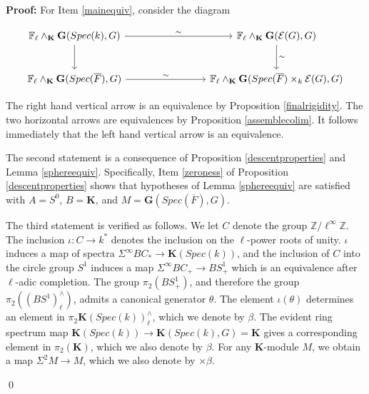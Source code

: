 \documentclass[11pt]{article}
\newcommand\mb{\mathbb}
\newcommand\mc{\mathcal}
\def \bK{\mathbf K}
\newcommand\mfk{\mathbf G}
\newenvironment{Proof}{\par\noindent\textbf{Proof:}}
{\qed}
\begin{document}
\begin{Proof}
   For Item \ref{mainequiv}, consider the diagram
\begin{center} \vspace{-1cm}
\begin{equation} 
\begin{tikzcd}[row sep=2.5em, column sep=8em]
\mb{F}_{\ell} \wedge  _{\bK} \mfk(Spec(k), G) 
\arrow[r, "\sim"] \arrow[d]
& \mb{F}_{\ell} \wedge  _{\bK} \mfk({\mc{E}(G) }, G) \arrow[d, "\sim"]
 \\
\mb{F}_{\ell} \wedge  _{\bK } \mfk(Spec(\overline{F}), G)
\arrow[r, "\sim"] 
&  \mb{F}_{\ell} \wedge  _{\bK} \mfk({Spec(\overline{F}) \times _k \mc{E}(G)}, G)
\end{tikzcd}
\end{equation}
\end{center}
The right hand vertical arrow is an equivalence by Proposition \ref{finalrigidity}. The two horizontal arrows are equivalences by Proposition \ref{assemblecolim}.  It follows immediately that the left hand vertical arrow is an equivalence.  


   The second statement  is a consequence of Proposition \ref{descentproperties}  and Lemma \ref{sphereequiv}. Specifically, Item \ref{zeroness} of Proposition \ref{descentproperties} shows that hypotheses of Lemma \ref{sphereequiv} are satisfied with $A = S^0$, $B = \bK$, and $M = \mfk(Spec(\overline{F}), G)$. 
   
 The third statement is verified as follows.  We let $C$ denote the group $\mb{Z}/{\ell}^{\infty} \mb{Z}$.  The inclusion $\iota: C \rightarrow k^*$  denotes the inclusion on the ${\ell}$-power roots of unity.  $\iota $ induces a map of spectra $\Sigma ^{\infty}BC_* \rightarrow \bK(Spec(k))$, and  the inclusion of $C$ into the circle group $S^1$ induces a map $\Sigma ^{\infty}BC_+ \rightarrow BS^1_+$ which is an equivalence after $\ell$-adic completion. The group $\pi _2 (BS^1_+)$, and therefore the group $\pi _2 ((BS^1)^{\wedge}_{\ell})$, admits a canonical generator $\theta$.  The element  $\iota(\theta)$  determines  an element in $\pi _2 \bK(Spec(k))^{\wedge}_{\ell}$, which we denote by $\beta$. The evident ring spectrum map $\bK(Spec(k)) \rightarrow \bK(Spec(k), G)= \bK$ gives a corresponding element in $\pi _2 (\bK)$, which we also denote by $\beta$. For any $\bK$-module $M$, we obtain a map $\Sigma ^2 M \rightarrow M$, which we also  denote by $\times \beta$.
 

\end{Proof}
\end{document}
